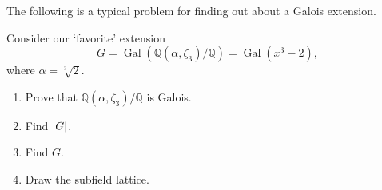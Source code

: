 \documentclass[notoc,notitlepage,nobib]{tufte-book}
\DeclareMathOperator{\Gal}{Gal}
\begin{document}
The following is a typical problem for finding out about a Galois extension.

\begin{eg}
  Consider our `favorite' extension
  \begin{equation*}
    G = \Gal( \mathbb{Q}(\alpha, \zeta_3) / \mathbb{Q} ) = \Gal(x^3 - 2),
  \end{equation*}
  where $\alpha = \sqrt[3]{2}$.
  \begin{enumerate}
    \item Prove that $\mathbb{Q}(\alpha, \zeta_3) / \mathbb{Q}$ is Galois.
    \item Find $\left|G\right|$.
    \item Find $G$.
    \item Draw the subfield lattice.
  \end{enumerate}
\end{eg}
\end{document}
